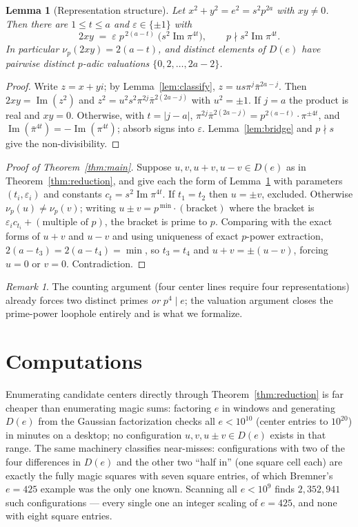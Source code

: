 \documentclass[11pt]{article}
\newtheorem{lemma}[theorem]{Lemma}
\theoremstyle{remark}
\newtheorem{remark}[theorem]{Remark}
\newcommand{\nup}{\nu_p}
\DeclareMathOperator{\im}{Im}
\begin{document}
\begin{lemma}[Representation structure]\label{lem:repstruct}
Let $x^2+y^2 = e^2 = s^2p^{2a}$ with $xy\neq 0$.  Then there are
$1\le t\le a$ and $\varepsilon\in\{\pm1\}$ with
\[
2xy \;=\; \varepsilon\; p^{\,2(a-t)}\;\bigl(s^2 \im \pi^{4t}\bigr),
\qquad p \nmid s^2 \im \pi^{4t} .
\]
In particular $\nup(2xy) = 2(a-t)$, and distinct elements of $D(e)$ have
pairwise distinct $p$-adic valuations $\{0,2,\dots,2a-2\}$.
\end{lemma}

\begin{proof}
Write $z=x+yi$; by Lemma~\ref{lem:classify}, $z=u s\pi^j\bar\pi^{2a-j}$.
Then $2xy=\im(z^2)$ and $z^2=u^2 s^2 \pi^{2j}\bar\pi^{2(2a-j)}$ with
$u^2=\pm 1$.  If $j=a$ the product is real and $xy=0$.  Otherwise, with
$t=|j-a|$, $\pi^{2j}\bar\pi^{2(2a-j)} = p^{2(a-t)}\cdot\pi^{\pm4t}$, and
$\im(\bar\pi^{4t})=-\im(\pi^{4t})$; absorb signs into $\varepsilon$.
Lemma~\ref{lem:bridge} and $p\nmid s$ give the non-divisibility.
\end{proof}

\begin{proof}[Proof of Theorem~\ref{thm:main}]
Suppose $u,v,u+v,u-v\in D(e)$ as in Theorem~\ref{thm:reduction}, and give
each the form of Lemma~\ref{lem:repstruct} with parameters
$(t_i,\varepsilon_i)$ and constants $c_t = s^2\im\pi^{4t}$.
If $t_1=t_2$ then $u=\pm v$, excluded.  Otherwise
$\nup(u)\neq\nup(v)$; writing $u\pm v = p^{\,\min}\cdot(\text{bracket})$ where
the bracket is $\varepsilon_i c_{t_i} + (\text{multiple of }p)$, the bracket
is prime to $p$.  Comparing with the exact forms of $u+v$ and $u-v$ and using
uniqueness of exact $p$-power extraction, $2(a-t_3)=2(a-t_4)=\min$, so
$t_3=t_4$ and $u+v=\pm(u-v)$, forcing $u=0$ or $v=0$.  Contradiction.
\end{proof}

\begin{remark}
The counting argument (four center lines require four representations)
already forces two distinct primes \emph{or} $p^4\mid e$; the valuation
argument closes the prime-power loophole entirely and is what we formalize.
\end{remark}

\section{Computations}

Enumerating candidate centers directly through
Theorem~\ref{thm:reduction} is far cheaper than enumerating magic sums:
factoring $e$ in windows and generating $D(e)$ from the Gaussian
factorization checks all $e<10^{10}$ (center entries to $10^{20}$) in minutes
on a desktop; no configuration $u,v,u\pm v \in D(e)$ exists in that range.
The same machinery classifies near-misses: configurations with two of the
four differences in $D(e)$ and the other two ``half in'' (one square cell
each) are exactly the fully magic squares with seven square entries, of which
Bremner's $e=425$ example was the only one known.  Scanning all $e<10^9$
finds $2{,}352{,}941$ such configurations --- every single one an integer
scaling of $e=425$, and none with eight square entries.
\end{document}
